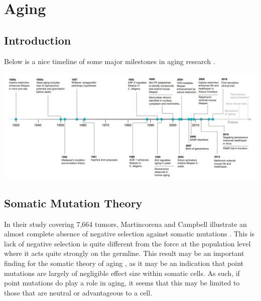 \documentclass[]{book}
\newenvironment{Shaded}{\begin{snugshade}}{\end{snugshade}}
\newcommand{\KeywordTok}[1]{\textcolor[rgb]{0.13,0.29,0.53}{\textbf{#1}}}
\newcommand{\DataTypeTok}[1]{\textcolor[rgb]{0.13,0.29,0.53}{#1}}
\newcommand{\DecValTok}[1]{\textcolor[rgb]{0.00,0.00,0.81}{#1}}
\newcommand{\StringTok}[1]{\textcolor[rgb]{0.31,0.60,0.02}{#1}}
\newcommand{\OtherTok}[1]{\textcolor[rgb]{0.56,0.35,0.01}{#1}}
\newcommand{\OperatorTok}[1]{\textcolor[rgb]{0.81,0.36,0.00}{\textbf{#1}}}
\newcommand{\NormalTok}[1]{#1}
\begin{document}
\chapter{Aging}\label{aging}

\section{Introduction}\label{introduction-2}

Below is a nice timeline of some major milestones in aging research
\citep{campisi2019discoveries}.

\begin{Shaded}
\end{Shaded}

\includegraphics{images/04-8.jpg}

\section{Somatic Mutation Theory}\label{somatic-mutation-theory}

In their study covering 7,664 tumors, Martincorena and Campbell
illustrate an almost complete absence of negative selection against
somatic mutations \citep{martincorena2017universal}. This is lack of
negative selection is quite different from the force at the population
level where it acts quite strongly on the germline. This result may be
an important finding for the somatic theory of aging
\citep{morley1995somatic}, as it may be an indication that point
mutations are largely of negligible effect size within somatic cells. As
such, if point mutations do play a role in aging, it seems that this may
be limited to those that are neutral or advantageous to a cell.
\end{document}

